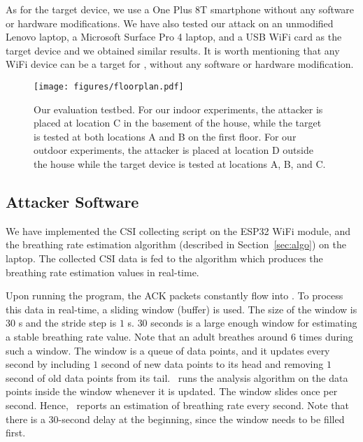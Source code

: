 As for the target device, we use a One Plus 8T smartphone without any software or hardware modifications. We have also tested our attack on an unmodified Lenovo laptop, a Microsoft Surface Pro 4 laptop, and a USB WiFi card as the target device and we obtained similar results. It is worth mentioning that any WiFi device can be a target for \wisneak, without any software or hardware modification. 


\begin{figure}[!t]
    \centering
    \texttt{[image: figures/floorplan.pdf]}
    \caption{Our evaluation testbed. For our indoor experiments, the attacker is placed at location C in the basement of the house, while the target is tested at both locations A and B on the first floor. For our outdoor experiments, the attacker is placed at location D outside the house while the target device is tested at locations A, B, and C.
    } 
    \vspace{-0.1in}
    \label{fig:floor_plan}
\end{figure}

\subsection{Attacker Software}
We have implemented the CSI collecting script on the ESP32 WiFi module, and the breathing rate estimation algorithm (described in Section~\ref{sec:algo}) on the laptop. The collected CSI data is fed to the algorithm which produces the breathing rate estimation values in real-time. 

Upon running the program, the ACK packets constantly flow into \wisneak. To process this data in real-time, a sliding window (buffer) is used. The size of the window is $30$ s and the stride step is $1$ s. 
$30$ seconds is a large enough window for estimating a stable breathing rate value. Note that an adult breathes around 6 times during such a window. The window is a queue of data points, and it updates every second by including $1$ second of new data points to its head and removing $1$ second of old data points from its tail. \wisneak\  runs the analysis algorithm on the data points inside the window whenever it is updated. The window slides once per second. Hence, \wisneak\  reports an estimation of breathing rate every second. Note that there is a $30$-second delay at the beginning, since the window needs to be filled first.



